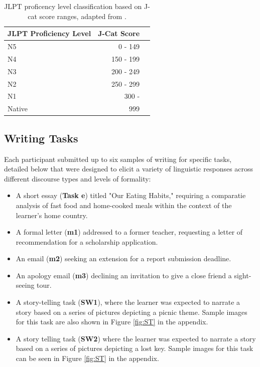 \begin{table}[h!]
\centering
\begin{tabular}{lrl}
\hline \textbf{JLPT Proficiency Level} & \textbf{J-Cat Score}  \\ \hline
N5 & 0 - 149 \\
N4 & 150 - 199 \\
N3 & 200 - 249 \\
N2 & 250 - 299 \\
N1 & 300 - \\
Native & 999
\hline
\end{tabular}
\caption[Proficency Levels]{JLPT proficency level classification based on J-cat score ranges, adapted from
\cite{jcat_interpretation_guide}.}
\label{tab:proficency-table}
\end{table}

\subsection{Writing Tasks}

Each participant submitted up to six samples of writing for specific tasks, detailed below that were designed to
elicit a variety of linguistic responses across different discourse types and levels of formality:
\begin{itemize}
    \item  A short essay (\textbf{Task e}) titled "Our Eating Habits," requiring a comparatie analysis of fast food
    and home-cooked
    meals within the context of the learner's home country.
    \item A formal letter (\textbf{m1}) addressed to a former teacher, requesting a letter of recommendation for a scholarship
    application.
    \item An email (\textbf{m2}) seeking an extension for a report submission deadline.
    \item An apology email (\textbf{m3}) declining an invitation to give a close friend a sight-seeing tour.
    \item A story-telling task (\textbf{SW1}), where the learner was expected to narrate a story based on a
    series of pictures depicting a picnic theme. Sample images for this task are also shown in Figure \ref{fig:ST}
    in the appendix.
    \item A story telling task (\textbf{SW2}) where the learner was expected to narrate a story based on a
    series of pictures depicting a lost key. Sample images for this task can be seen in Figure \ref{fig:ST} in the
    appendix.
\end{itemize}

